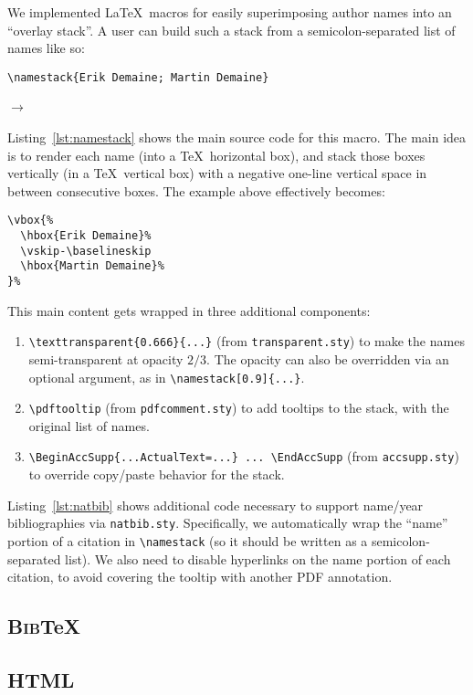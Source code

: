 \documentclass[natbib,authoryear]{sigtbd17-style}
\begin{document}
We implemented \LaTeX\ macros for easily superimposing author names
into an ``overlay stack''.
A user can build such a stack from a semicolon-separated list of names
like so:

\begin{center}
  \lstinline|\namestack{Erik Demaine; Martin Demaine}|

  $\to$ ~
\end{center}



Listing~\ref{lst:namestack} shows the main source code for this macro.
The main idea is to render each name (into a \TeX\ horizontal box),
and stack those boxes vertically (in a \TeX\ vertical box)
with a negative one-line vertical space in between consecutive boxes.
The example above effectively becomes:

\begin{center}
\begin{lstlisting}
\vbox{%
  \hbox{Erik Demaine}%
  \vskip-\baselineskip
  \hbox{Martin Demaine}%
}%
\end{lstlisting}
\end{center}

This main content gets wrapped in three additional components:
%
\begin{enumerate}
\item \lstinline|\texttransparent{0.666}{...}| (from \texttt{transparent.sty})
  to make the names semi-transparent at opacity $2/3$.
  The opacity can also be overridden via an optional argument, as in
  \lstinline|\namestack[0.9]{...}|.
\item \lstinline|\pdftooltip| (from \texttt{pdfcomment.sty})
  to add tooltips to the stack, with the original list of names.
\item \lstinline|\BeginAccSupp{...ActualText=...} ... \EndAccSupp|
  (from \texttt{accsupp.sty}) to override copy/paste behavior for the stack.
\end{enumerate}

Listing~\ref{lst:natbib} shows additional code necessary to support
name/year bibliographies via \texttt{natbib.sty}.  Specifically, we
automatically wrap the ``name'' portion of a citation in
\lstinline|\namestack| (so it should be written as a semicolon-separated list).
We also need to disable hyperlinks on the name portion of each citation,
to avoid covering the tooltip with another PDF annotation.



\subsection{\textsc{Bib}\TeX}

\subsection{HTML}



%
\end{document}
